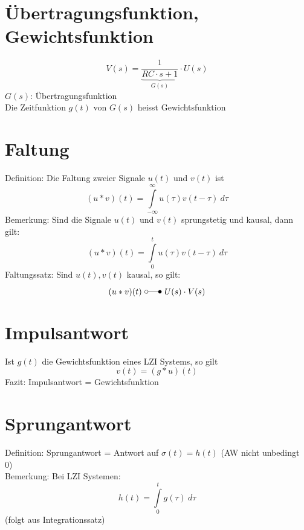 \section{Übertragungsfunktion, Gewichtsfunktion}
\[ 
    V(s) = \underbrace{\frac{1}{RC \cdot s + 1}}_{G(s)} \cdot U(s) 
\]
$G(s)$: Übertragungsfunktion\\
Die Zeitfunktion $g(t)$ von $G(s)$ heisst Gewichtsfunktion\\

\section{Faltung}
Definition: Die Faltung zweier Signale $u(t)$ und $v(t)$ ist
\[ 
    (u * v)(t) = \int\limits_{-\infty}^{\infty} u(\tau) v(t - \tau) ~ d \tau 
\]
Bemerkung: Sind die Signale $u(t)$ und $v(t)$ sprungstetig und kausal, dann
gilt:
\[ 
    (u * v)(t) = \int\limits_{0}^{t} u(\tau) v(t - \tau) ~ d \tau 
\]
Faltungssatz:
Sind $u(t), v(t)$ kausal, so gilt:
\[ 
    (u * v) (t) ~ \laplace ~ U(s) \cdot V(s) 
\]

\section{Impulsantwort}
Ist $g(t)$ die Gewichtsfunktion eines LZI Systems, so gilt
\[ 
    v(t) = (g * u)(t) 
\]
Fazit: Impulsantwort = Gewichtsfunktion

\section{Sprungantwort}
Definition: Sprungantwort = Antwort auf $\sigma(t) = h(t)$
(AW nicht unbedingt 0) \\
Bemerkung: Bei LZI Systemen:
\[ 
    h(t) = \int\limits_{0}^{t} g(\tau) ~d \tau 
\]
(folgt aus Integrationssatz)
